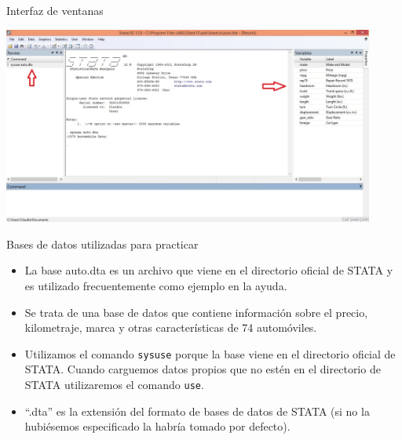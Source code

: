 \documentclass{beamer}
\begin{document}
\begin{frame}{Interfaz de ventanas}
\centerline{\includegraphics[height=6.5cm]{Ventanas1.jpg}}
\end{frame}


\begin{frame}{Bases de datos utilizadas para practicar}
\begin{itemize}
\item La base auto.dta es un archivo que viene en el directorio oficial de STATA y es utilizado frecuentemente como ejemplo en la ayuda. 
\item Se trata de una base de datos que contiene información sobre el precio, kilometraje, marca y otras características de 74 automóviles.
\item Utilizamos el comando \texttt{sysuse} porque la base viene en el directorio oficial de STATA. Cuando carguemos datos propios que no estén en el directorio de STATA utilizaremos el comando \texttt{use}.
\item ``.dta'' es la extensión del formato de bases de datos de STATA (si no la hubiésemos especificado la habría tomado por defecto). 
\end{itemize}
\end{frame}
\end{document}
